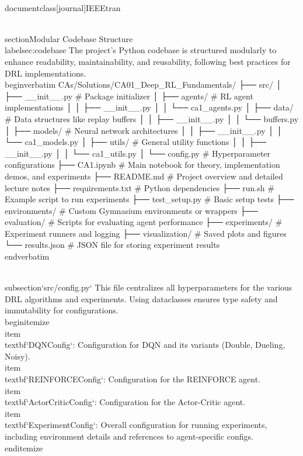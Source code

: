 \\documentclass[journal]{IEEEtran}
\begin{document}
\\section{Modular Codebase Structure}
\\label{sec:codebase}
The project's Python codebase is structured modularly to enhance readability, maintainability, and reusability, following best practices for DRL implementations.
\\begin{verbatim}
CAs/Solutions/CA01_Deep_RL_Fundamentals/
├── src/
│   ├── __init__.py          # Package initializer
│   ├── agents/              # RL agent implementations
│   │   ├── __init__.py
│   │   └── ca1_agents.py
│   ├── data/                # Data structures like replay buffers
│   │   ├── __init__.py
│   │   └── buffers.py
│   ├── models/              # Neural network architectures
│   │   ├── __init__.py
│   │   └── ca1_models.py
│   ├── utils/               # General utility functions
│   │   ├── __init__.py
│   │   └── ca1_utils.py
│   └── config.py            # Hyperparameter configurations
├── CA1.ipynb               # Main notebook for theory, implementation demos, and experiments
├── README.md               # Project overview and detailed lecture notes
├── requirements.txt        # Python dependencies
├── run.sh                  # Example script to run experiments
├── test_setup.py           # Basic setup tests
├── environments/           # Custom Gymnasium environments or wrappers
├── evaluation/             # Scripts for evaluating agent performance
├── experiments/            # Experiment runners and logging
├── visualization/          # Saved plots and figures
└── results.json            # JSON file for storing experiment results
\\end{verbatim}

\\subsection{`src/config.py`}
This file centralizes all hyperparameters for the various DRL algorithms and experiments. Using dataclasses ensures type safety and immutability for configurations.
\\begin{itemize}
    \\item \\textbf{`DQNConfig`}: Configuration for DQN and its variants (Double, Dueling, Noisy).
    \\item \\textbf{`REINFORCEConfig`}: Configuration for the REINFORCE agent.
    \\item \\textbf{`ActorCriticConfig`}: Configuration for the Actor-Critic agent.
    \\item \\textbf{`ExperimentConfig`}: Overall configuration for running experiments, including environment details and references to agent-specific configs.
\\end{itemize}
\end{document}
